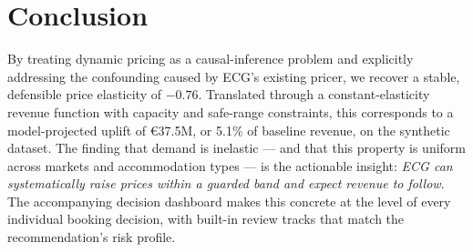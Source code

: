 \documentclass[11pt,a4paper]{article}
\begin{document}
\section{Conclusion}

By treating dynamic pricing as a causal-inference problem and explicitly addressing the confounding caused by ECG's existing pricer, we recover a stable, defensible price elasticity of $-0.76$. Translated through a constant-elasticity revenue function with capacity and safe-range constraints, this corresponds to a model-projected uplift of \euro{}37.5M, or 5.1\% of baseline revenue, on the synthetic dataset. The finding that demand is inelastic --- and that this property is uniform across markets and accommodation types --- is the actionable insight: \emph{ECG can systematically raise prices within a guarded band and expect revenue to follow}. The accompanying decision dashboard makes this concrete at the level of every individual booking decision, with built-in review tracks that match the recommendation's risk profile.
\end{document}
